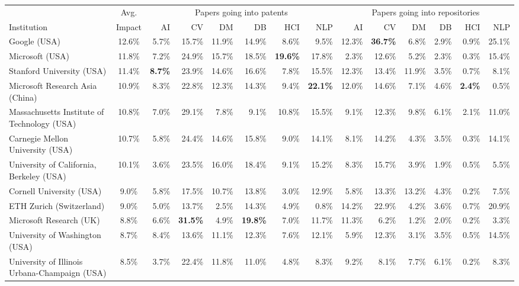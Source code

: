 \begin{tabular}{lc|rrrrrr|rrrrrr}
    \toprule
                & Avg. & \multicolumn{6}{c}{Papers going into patents} & \multicolumn{6}{c}{Papers going into repositories} \\
    Institution & Impact & AI & CV & DM & DB & HCI & NLP & AI & CV & DM & DB & HCI & NLP \\
    \midrule
    Google (USA) & 12.6\% & 5.7\% & 15.7\% & 11.9\% & 14.9\% & 8.6\% & 9.5\% & 12.3\% & \bfseries 36.7\% & 6.8\% & 2.9\% & 0.9\% & 25.1\% \\
    Microsoft (USA) & 11.8\% & 7.2\% & 24.9\% & 15.7\% & 18.5\% & \bfseries 19.6\% & 17.8\% & 2.3\% & 12.6\% & 5.2\% & 2.3\% & 0.3\% & 15.4\% \\
    Stanford University (USA) & 11.4\% & \bfseries 8.7\% & 23.9\% & 14.6\% & 16.6\% & 7.8\% & 15.5\% & 12.3\% & 13.4\% & 11.9\% & 3.5\% & 0.7\% & 8.1\% \\
    Microsoft Research Asia (China) & 10.9\% & 8.3\% & 22.8\% & 12.3\% & 14.3\% & 9.4\% & \bfseries 22.1\% & 12.0\% & 14.6\% & 7.1\% & 4.6\% & \bfseries 2.4\% & 0.5\% \\
    Massachusetts Institute of Technology (USA) & 10.8\% & 7.0\% & 29.1\% & 7.8\% & 9.1\% & 10.8\% & 15.5\% & 9.1\% & 12.3\% & 9.8\% & 6.1\% & 2.1\% & 11.0\% \\
    Carnegie Mellon University (USA) & 10.7\% & 5.8\% & 24.4\% & 14.6\% & 15.8\% & 9.0\% & 14.1\% & 8.1\% & 14.2\% & 4.3\% & 3.5\% & 0.3\% & 14.1\% \\
    University of California, Berkeley (USA) & 10.1\% & 3.6\% & 23.5\% & 16.0\% & 18.4\% & 9.1\% & 15.2\% & 8.3\% & 15.7\% & 3.9\% & 1.9\% & 0.5\% & 5.5\% \\
    Cornell University (USA) & 9.0\% & 5.8\% & 17.5\% & 10.7\% & 13.8\% & 3.0\% & 12.9\% & 5.8\% & 13.3\% & 13.2\% & 4.3\% & 0.2\% & 7.5\% \\
    ETH Zurich (Switzerland) & 9.0\% & 5.0\% & 13.7\% & 2.5\% & 14.3\% & 4.9\% & 0.8\% & 14.2\% & 22.9\% & 4.2\% & 3.6\% & 0.7\% & 20.9\% \\
    Microsoft Research (UK) & 8.8\% & 6.6\% & \bfseries 31.5\% & 4.9\% & \bfseries 19.8\% & 7.0\% & 11.7\% & 11.3\% & 6.2\% & 1.2\% & 2.0\% & 0.2\% & 3.3\% \\
    University of Washington (USA) & 8.7\% & 8.4\% & 13.6\% & 11.1\% & 12.3\% & 7.6\% & 12.1\% & 5.9\% & 12.3\% & 3.1\% & 3.5\% & 0.5\% & 14.5\% \\
    University of Illinois Urbana-Champaign (USA) & 8.5\% & 3.7\% & 22.4\% & 11.8\% & 11.0\% & 4.8\% & 8.3\% & 9.2\% & 8.1\% & 7.7\% & 6.1\% & 0.2\% & 8.3\% \\

\end{tabular}
